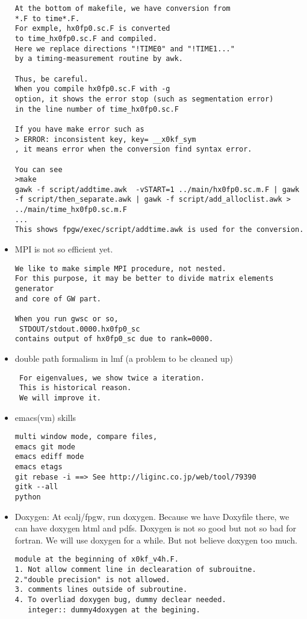 \documentclass[a4paper,10pt,fleqn]{article}
\begin{document}
\begin{itemize}
\begin{verbatim}
At the bottom of makefile, we have conversion from 
*.F to time*.F. 
For exmple, hx0fp0.sc.F is converted
to time_hx0fp0.sc.F and compiled. 
Here we replace directions "!TIME0" and "!TIME1..."
by a timing-measurement routine by awk.

Thus, be careful. 
When you compile hx0fp0.sc.F with -g
option, it shows the error stop (such as segmentation error)
in the line number of time_hx0fp0.sc.F

If you have make error such as
> ERROR: inconsistent key, key= __x0kf_sym                                      
, it means error when the conversion find syntax error.

You can see 
>make
gawk -f script/addtime.awk  -vSTART=1 ../main/hx0fp0.sc.m.F | gawk -f script/then_separate.awk | gawk -f script/add_alloclist.awk > ../main/time_hx0fp0.sc.m.F
...
This shows fpgw/exec/script/addtime.awk is used for the conversion.
\end{verbatim}


\item MPI is not so efficient yet.
\begin{verbatim}
We like to make simple MPI procedure, not nested.
For this purpose, it may be better to divide matrix elements generator
and core of GW part.

When you run gwsc or so, 
 STDOUT/stdout.0000.hx0fp0_sc
contains output of hx0fp0_sc due to rank=0000.
\end{verbatim}

\item double path formalism in lmf (a problem to be cleaned up)
\begin{verbatim}
 For eigenvalues, we show twice a iteration.
 This is historical reason. 
 We will improve it.
\end{verbatim}

\item emacs(vm) skills
\begin{verbatim}
multi window mode, compare files,
emacs git mode
emacs ediff mode
emacs etags
git rebase -i ==> See http://liginc.co.jp/web/tool/79390
gitk --all
python
\end{verbatim}


\item Doxygen:
At ecalj/fpgw, run doxygen. Because we have Doxyfile there,
we can have doxygen html and pdfs.
Doxygen is not so good but not so bad for fortran.
We will use doxygen for a while. But not believe doxygen too much.
\begin{verbatim} 
module at the beginning of x0kf_v4h.F.
1. Not allow comment line in declearation of subrouitne.
2."double precision" is not allowed.
3. comments lines outside of subroutine.
4. To overliad doxygen bug, dummy declear needed.
   integer:: dummy4doxygen at the begining.
\end{verbatim}


\end{itemize}
\end{document}
